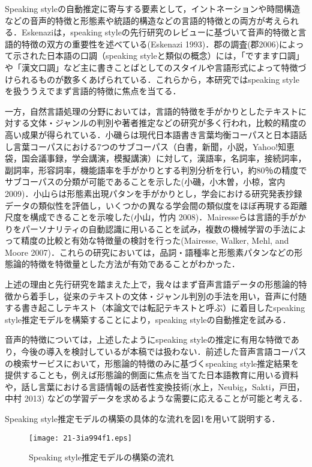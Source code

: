 \documentclass[japanese]{jnlp_1.4}
\begin{document}
Speaking styleの自動推定に寄与する要素として，イントネーションや時間構造などの音声的特徴と形態素や統語的構造などの言語的特徴との両方が考えられる．Eskenaziは，speaking styleの先行研究のレビューに基づいて音声的特徴と言語的特徴の双方の重要性を述べている(Eskenazi 1993)．郡の調査(郡2006)によって示された日本語の口調（speaking styleと類似の概念）には，「ですます口調」や「漢文口調」など主に書きことばとしてのスタイルや言語形式によって特徴づけられるものが数多くあげられている．これらから，本研究ではspeaking styleを扱ううえでまず言語的特徴に焦点を当てる．

一方，自然言語処理の分野においては，言語的特徴を手がかりとしたテキストに対する文体・ジャンルの判別や著者推定などの研究が多く行われ，比較的精度の高い成果が得られている．小磯らは現代日本語書き言葉均衡コーパスと日本語話し言葉コーパスにおける7つのサブコーパス（白書，新聞，小説，Yahoo!知恵袋，国会議事録，学会講演，模擬講演）に対して，漢語率，名詞率，接続詞率，副詞率，形容詞率，機能語率を手がかりとする判別分析を行い，約80％の精度でサブコーパスの分類が可能であることを示した(小磯，小木曽，小椋，宮内 2009)．小山らは形態素出現パタンを手がかりとし，学会における研究発表抄録データの類似性を評価し，いくつかの異なる学会間の類似度をほぼ再現する距離尺度を構成できることを示唆した(小山，竹内 2008)．Mairesseらは言語的手がかりをパーソナリティの自動認識に用いることを試み，複数の機械学習の手法によって精度の比較と有効な特徴量の検討を行った(Mairesse, Walker, Mehl, and Moore 2007)．これらの研究においては，品詞・語種率と形態素パタンなどの形態論的特徴を特徴量とした方法が有効であることがわかった．

上述の理由と先行研究を踏まえた上で，我々はまず音声言語データの形態論的特徴から着手し，従来のテキストの文体・ジャンル判別の手法を用い，音声に付随する書き起こしテキスト（本論文では転記テキストと呼ぶ）に着目したspeaking style推定モデルを構築することにより，speaking styleの自動推定を試みる．

音声的特徴については，上述したようにspeaking styleの推定に有用な特徴であり，今後の導入を検討しているが本稿では扱わない．前述した音声言語コーパスの検索サービスにおいて，形態論的特徴のみに基づくspeaking style推定結果を提供することも，例えば形態論的側面に焦点を当てた日本語教育に用いる資料や，話し言葉における言語情報の話者性変換技術(水上，Neubig，Sakti，戸田，中村 2013) などの学習データを求めるような需要に応えることが可能と考える．

Speaking style推定モデルの構築の具体的な流れを図1を用いて説明する．

\begin{figure}[b]
\begin{center}
\texttt{[image: 21-3ia994f1.eps]}
\end{center}
\caption{Speaking style推定モデルの構築の流れ}
\end{figure}
\end{document}

